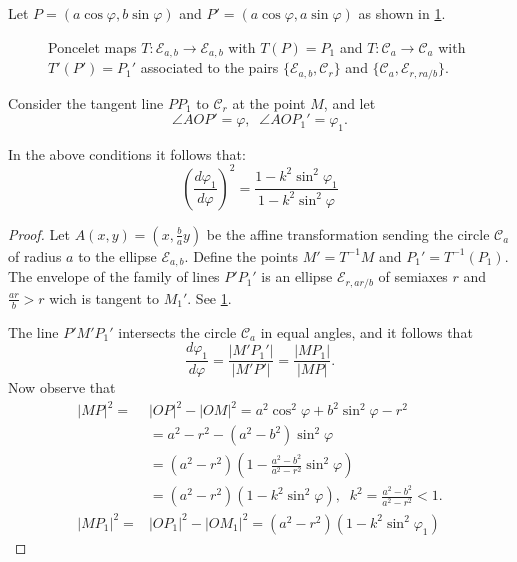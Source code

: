 Let $P=(a\cos\varphi, b\sin\varphi)$ and $P'=(a\cos\varphi, a\sin\varphi)$ as shown in   \cref{fig:ec}.
\begin{figure}[H]
	\begin{center}
		\def\svgwidth{0.8\textwidth}
		
		\caption { Poncelet maps $T:\mathcal{E}_{a,b}\to\mathcal{E}_{a,b}$ with $T(P)=P_1$ and $T:\mathcal{C}_{a}\to\mathcal{C}_{a}$ with $T'(P')=P_1'$ associated to  the pairs $\{\mathcal{E}_{a,b},\mathcal{C}_r\}$ and $\{\mathcal{C}_a,\mathcal{E}_{r,ra/b}\}$. \label{fig:ec}}
	\end{center}
\end{figure}
Consider the tangent line $PP_1$ to $\mathcal{C}_r$ at the point $M$, and let
\[\angle AOP'=\varphi, \;\; \angle AOP_1'=\varphi_1.\]
\begin{proposition} In the above conditions it follows that:
    \begin{equation}
        \left(\frac{d\varphi_1}{d\varphi}\right)^2=\frac{1-k^2\sin^2\varphi_1}{1-k^2\sin^2\varphi}
            \label{eq:variacaoangular}
    \end{equation}
    \label{prop:variacaoangular}
\end{proposition}
 \begin{proof}
 Let $A(x,y)=(x,\frac{b }{a} y)$ be the affine transformation sending the circle $\mathcal{C}_a$ of radius $a$ to the ellipse $\mathcal{E}_{a,b}.$ Define the points $M'=T^{-1}M$ and $P_1'=T^{-1}{(P_1)}$. The envelope of the family of  lines $P'P_1'$ is an ellipse $\mathcal{E}_{r,ar/b}$ of semiaxes $r$ and $\frac{ar}{b}>r$ wich is tangent to $M_1'$. See  \cref{fig:ec}. 
 
 The line $P'M'P_1'$ intersects the circle $\mathcal{C}_a$ in equal angles, and it follows that
 \[\frac{d\varphi_1}{d\varphi}=\frac{|M'P_1'|}{|M'P'|}=\frac{|MP_1|}{|MP|}.\]
    Now observe that
    \begin{align*}
    |MP|^2=&|OP|^2-|OM|^2 = a^2\cos^2\varphi+b^2\sin^2\varphi-r^2\\
    &=a^2-r^2-(a^2-b^2)\sin^2\varphi\\
    &=(a^2-r^2)\left(1-\frac{a^2-b^2}{a^2-r^2}\sin^2\varphi\right)\\
    &=(a^2-r^2)(1-k^2\sin^2\varphi),\;\;k^2=\frac{a^2-b^2}{a^2-r^2}<1.\\
     |MP_1|^2=&|OP_1|^2-|OM_1|^2=(a^2-r^2)\left(1-k^2\sin^2\varphi_1\right)
    \end{align*}
 \end{proof}
 
